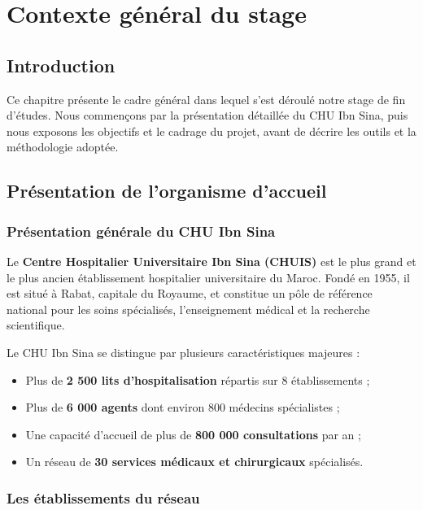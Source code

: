 \documentclass[12pt,a4paper]{report}
\begin{document}
	\chapter{Contexte général du stage}
	
	\section{Introduction}
	Ce chapitre présente le cadre général dans lequel s'est déroulé notre stage de fin d'études.
	Nous commençons par la présentation détaillée du CHU Ibn Sina, puis nous exposons les
	objectifs et le cadrage du projet, avant de décrire les outils et la méthodologie adoptée.
	
	\section{Présentation de l'organisme d'accueil}
	
	\subsection{Présentation générale du CHU Ibn Sina}
	Le \textbf{Centre Hospitalier Universitaire Ibn Sina (CHUIS)} est le plus grand et le plus
	ancien établissement hospitalier universitaire du Maroc. Fondé en 1955, il est situé à Rabat,
	capitale du Royaume, et constitue un pôle de référence national pour les soins spécialisés,
	l'enseignement médical et la recherche scientifique.
	
	Le CHU Ibn Sina se distingue par plusieurs caractéristiques majeures :
	\begin{itemize}
		\item Plus de \textbf{2 500 lits d'hospitalisation} répartis sur 8 établissements ;
		\item Plus de \textbf{6 000 agents} dont environ 800 médecins spécialistes ;
		\item Une capacité d'accueil de plus de \textbf{800 000 consultations} par an ;
		\item Un réseau de \textbf{30 services médicaux et chirurgicaux} spécialisés.
	\end{itemize}
	
	\subsection{Les établissements du réseau}
	
\end{document}
